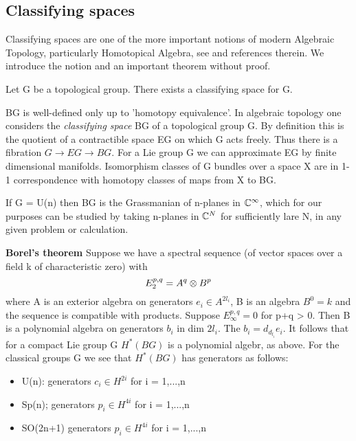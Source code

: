 \subsection{Classifying spaces}
Classifying spaces are one of the more important notions of modern Algebraic Topology, particularly Homotopical Algebra, see \cite{hatcher_algebraic_2001} 
and references therein. We introduce the notion and an important theorem without proof.
\begin{theorem}[Milnor]
 Let G be a topological group. There exists a classifying space for G. 
\end{theorem}
BG is well-defined only up to 'homotopy equivalence'.
In algebraic topology one considers the \textit{classifying space} BG of a topological group G. By definition this 
is the quotient of a contractible space EG on which G acts freely. Thus there is a fibration 
$G \rightarrow EG \rightarrow BG$. For a Lie group G we can approximate EG by finite dimensional manifolds. 
Isomorphism classes of G bundles over a space X are in 1-1 correspondence with homotopy classes of maps from X to BG.
\begin{example}
 If G = U(n) then BG is the Grassmanian of n-planes in $\mathbb{C}^{\infty}$, which for our purposes can be studied by taking
 n-planes in $\mathbb{C}^{N}$ for sufficiently lare N, in any given problem or calculation.
\end{example}
\textbf{Borel's theorem}
Suppose we have a spectral sequence (of vector spaces over a field k of characteristic zero) with 
\begin{equation*}
 E^{p,q}_{2} = A^q \otimes B^p
\end{equation*}
where A is an exterior algebra on generators $e_i \in A^{2l_{i}}$, B is an algebra $B^0 = k$ and the sequence is compatible
with products. Suppose $E^{p,q}_{\infty} = 0$ for p+q > 0. Then B is a polynomial algebra on generators $b_i$ in dim $2l_i$.
The $b_i = d_{d_{l_{i}}}e_{i}$.
It follows that for a compact Lie group G $H^*(BG)$ is a polynomial algebr, as above. For the classical groups G we see that $H^*(BG)$
has generators as follows:
\begin{itemize}
 \item U(n): generators $c_i \in H^{2i}$ for i = 1,...,n
 \item Sp(n); generators $p_i \in H^{4i}$ for i = 1,...,n
 \item SO(2n+1) generators $p_i \in H^{4i}$ for i = 1,...,n
\end{itemize}

